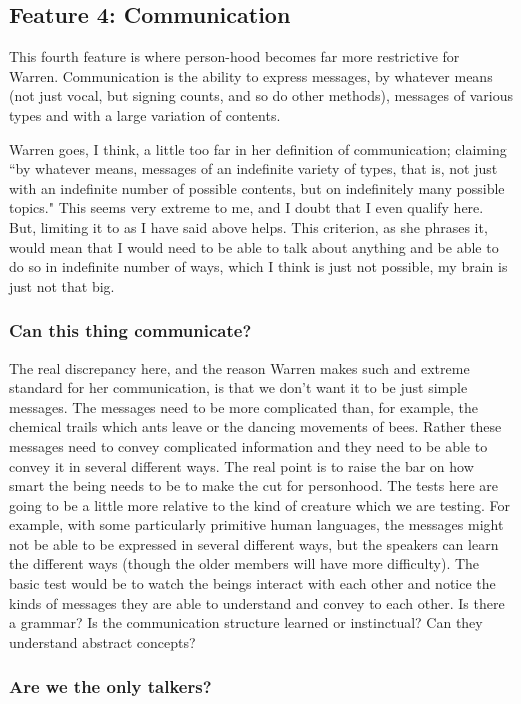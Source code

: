 \subsection{Feature 4: Communication}

This fourth feature is where person-hood becomes far more restrictive for Warren. Communication is the ability to express messages, by whatever means (not just vocal, but signing counts, and so do other methods), messages of various types and with a large variation of contents. 

Warren goes, I think, a little too far in her definition of communication; claiming ``by whatever means, messages of an indefinite variety of types, that is, not just with an indefinite number of possible contents, but on indefinitely many possible topics." This seems very extreme to me, and I doubt that I even qualify here. But, limiting it to as I have said above helps. This criterion, as she phrases it, would mean that I would need to be able to talk about anything and  be able to do so in indefinite number of ways, which I think is just not possible, my brain is just not that big.
\subsubsection{Can this thing communicate?}

The real discrepancy here, and the reason Warren makes such and extreme standard for her communication, is that we don't want it to be just simple messages. The messages need to be more complicated than, for example, the chemical trails which ants leave or the dancing movements of bees. Rather these messages need to convey complicated information and they need to be able to convey it in several different ways.  The real point is to raise the bar on how smart the being needs to be to make the cut for personhood. The tests here are going to be a little more relative to the kind of creature which we are testing. For example, with some particularly primitive human languages, the messages might not be able to be expressed in several different ways, but the speakers can learn the different ways (though the older members will have more difficulty). The basic test would be to watch the beings interact with each other and notice the kinds of messages they are able to understand and convey to each other. Is there a grammar? Is the communication structure learned or instinctual? Can they understand abstract concepts?   
\subsubsection{Are we the only talkers?}

